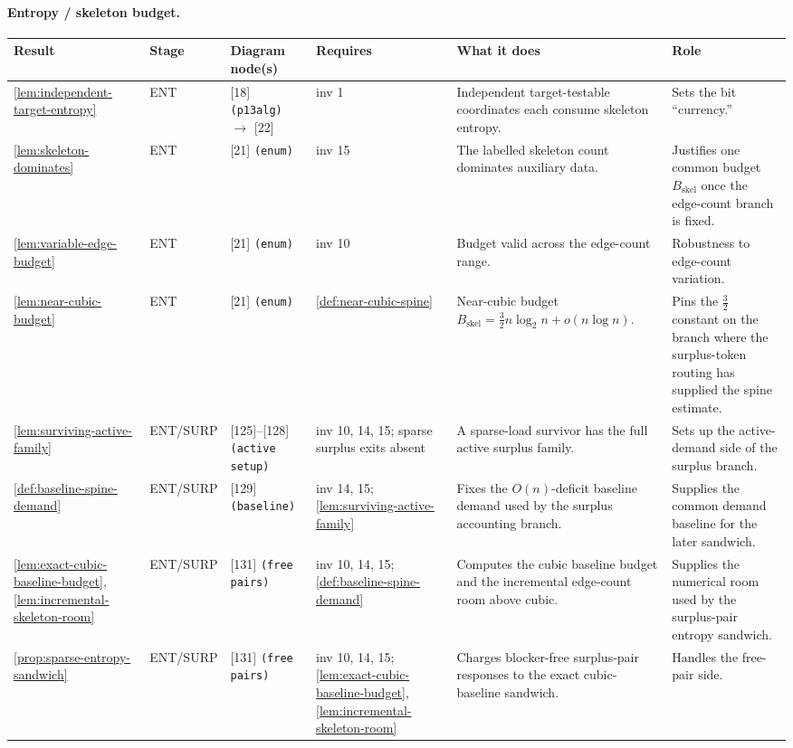 \documentclass[11pt]{article}
\begin{document}
\paragraph{Entropy / skeleton budget.}
{\scriptsize\setlength{\tabcolsep}{3pt}
\begin{longtable}{L{0.10\textwidth} C{0.045\textwidth} L{0.13\textwidth} L{0.135\textwidth} L{0.28\textwidth} L{0.20\textwidth}}
\toprule
\textbf{Result} & \textbf{Stage} & \textbf{Diagram node(s)} & \textbf{Requires} & \textbf{What it does} & \textbf{Role} \\
\midrule
\endhead
\cref{lem:independent-target-entropy} & ENT & [18] \texttt{(p13alg)} $\to$ [22] & inv 1 & Independent target-testable coordinates each consume skeleton entropy. & Sets the bit ``currency.'' \\
\cref{lem:skeleton-dominates} & ENT & [21] \texttt{(enum)} & inv 15 & The labelled skeleton count dominates auxiliary data. & Justifies one common budget $B_{\mathrm{skel}}$ once the edge-count branch is fixed. \\
\cref{lem:variable-edge-budget} & ENT & [21] \texttt{(enum)} & inv 10 & Budget valid across the edge-count range. & Robustness to edge-count variation. \\
\cref{lem:near-cubic-budget} & ENT & [21] \texttt{(enum)} & \cref{def:near-cubic-spine} & Near-cubic budget $B_{\mathrm{skel}}=\tfrac32 n\log_2 n+o(n\log n)$. & Pins the $\tfrac32$ constant on the branch where the surplus-token routing has supplied the spine estimate. \\
\cref{lem:surviving-active-family} & ENT\slash SURP & [125]--[128] \texttt{(active setup)} & inv 10, 14, 15; sparse surplus exits absent & A sparse-load survivor has the full active surplus family. & Sets up the active-demand side of the surplus branch. \\
\cref{def:baseline-spine-demand} & ENT\slash SURP & [129] \texttt{(baseline)} & inv 14, 15; \cref{lem:surviving-active-family} & Fixes the \(O(n)\)-deficit baseline demand used by the surplus accounting branch. & Supplies the common demand baseline for the later sandwich. \\
\cref{lem:exact-cubic-baseline-budget}, \cref{lem:incremental-skeleton-room} & ENT\slash SURP & [131] \texttt{(free pairs)} & inv 10, 14, 15; \cref{def:baseline-spine-demand} & Computes the cubic baseline budget and the incremental edge-count room above cubic. & Supplies the numerical room used by the surplus-pair entropy sandwich. \\
\cref{prop:sparse-entropy-sandwich} & ENT\slash SURP & [131] \texttt{(free pairs)} & inv 10, 14, 15; \cref{lem:exact-cubic-baseline-budget}, \cref{lem:incremental-skeleton-room} & Charges blocker-free surplus-pair responses to the exact cubic-baseline sandwich. & Handles the free-pair side. \\

\end{longtable}}
\end{document}
